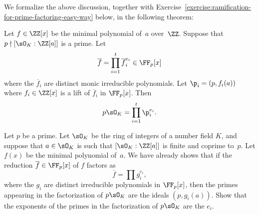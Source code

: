 We formalize the above discussion, together with
Exercise~\ref{exercise:ramification-for-prime-factoring-easy-way} below,
in the following theorem:
\begin{theorem}\label{thm:fac1}
  Let $f\in\ZZ[x]$ be the minimal polynomial of~$a$ over~$\ZZ$.
  Suppose that~$p\nmid [\sO_K:\ZZ[a]]$ is a prime. Let
  $$
    \overline{f} = \prod_{i=1}^t \overline{f}_i^{e_i} \in \FF_p[x]
  $$
  where the $\overline{f}_i$ are distinct monic irreducible
  polynomials. Let $\p_i = (p,f_i(a))$ where $f_i\in\ZZ[x]$ is a
  lift of $\overline{f}_i$ in $\FF_p[x]$. Then
  $$
    p\sO_K = \prod_{i=1}^t \p_i^{e_i}.
  $$
\end{theorem}

\begin{exercise}\label{exercise:ramification-for-prime-factoring-easy-way}
  Let $p$ be a prime. Let $\sO_K$ be the ring of integers of a number
  field $K$, and suppose that $a\in \sO_K$ is such that $[\sO_K:\ZZ[a]]$ is
  finite and coprime to~$p$. Let $f(x)$ be the minimal polynomial of~$a$.
  We have already shows that if the reduction $\overline{f}\in\FF_p[x]$ of $f$
  factors as
  $$
    \overline{f} = \prod g_i^{e_i},
  $$
  where the $g_i$ are distinct irreducible polynomials in $\FF_p[x]$,
  then the primes appearing in the factorization of $p\sO_K$ are the
  ideals $(p,g_i(a))$. Show that the exponents of the primes in the
  factorization of $p\sO_K$ are the $e_i$.
\end{exercise}


